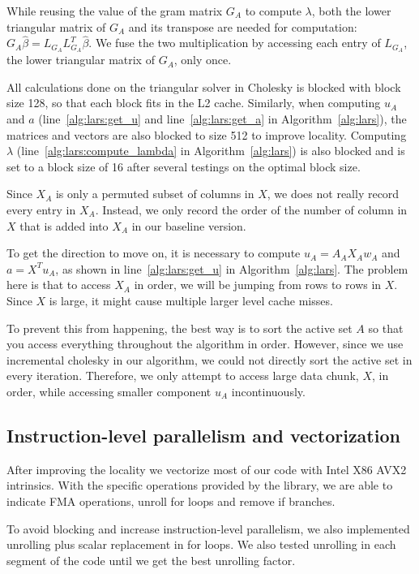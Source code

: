 While reusing the value of the gram matrix $G_A$ to compute $\lambda$, both the lower triangular matrix of $G_A$ and its transpose are needed for computation: $G_A \hat{\beta} = L_{G_A} L_{G_A}^T \hat{\beta}$. We fuse the two multiplication by accessing each entry of $L_{G_A}$, the lower triangular matrix of $G_A$, only once.

 All calculations done on the triangular solver in Cholesky is blocked with block size 128, so that each block fits in the L2 cache. 
Similarly, when computing $u_A$ and $a$ (line~\ref{alg:lars:get_u} and line~\ref{alg:lars:get_a} in Algorithm~\ref{alg:lars}), the matrices and vectors are also blocked to size 512 to improve locality.
Computing $\lambda$ (line~\ref{alg:lars:compute_lambda} in Algorithm~\ref{alg:lars}) is also blocked and is set to a block size of 16 after several testings on the optimal block size.


Since $X_A$ is only a permuted subset of columns in $X$, we does not really record every entry in $X_A$. Instead, we only record the order of the number of column in $X$ that is added into $X_A$ in our baseline version.

To get the direction to move on, it is necessary to compute $u_A = A_A X_A w_A$ and $a = X^T u_A$, as shown in line~\ref{alg:lars:get_u} in Algorithm~\ref{alg:lars}.
The problem here is that to access $X_A$ in order, we will be jumping from rows to rows in $X$.
Since $X$ is large, it might cause multiple larger level cache misses.

To prevent this from happening, the best way is to sort the active set $A$ so that you access everything throughout the algorithm in order.
However, since we use incremental cholesky in our algorithm, we could not directly sort the active set in every iteration.
Therefore, we only attempt to access large data chunk, $X$, in order, while accessing smaller component $u_A$ incontinuously.

\subsection{Instruction-level parallelism and vectorization}
After improving the locality we vectorize most of our code with Intel X86 AVX2 intrinsics.
With the specific operations provided by the library, we are able to indicate FMA operations,
unroll for loops and remove if branches.

To avoid blocking and increase instruction-level parallelism, we also implemented unrolling plus scalar replacement in for loops.
We also tested unrolling in each segment of the code until we get the best unrolling factor.

